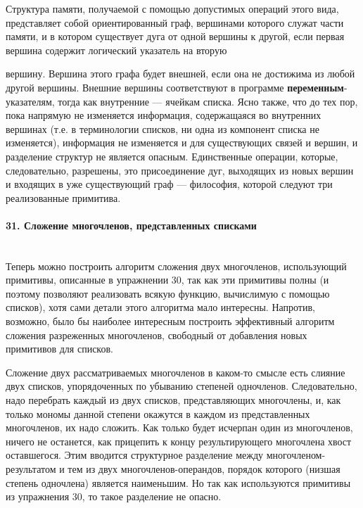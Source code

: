 \documentclass{../../template/mai_book}
\begin{document}
Структура памяти, получаемой с помощью допустимых операций этого вида, представляет собой ориентированный граф, вершинами которого служат части памяти, и в котором существует дуга от одной вершины к другой, если первая вершина содержит логический указатель на вторую \linebreak

\newpage


\noindent
вершину. Вершина этого графа будет внешней, если она не достижима из любой другой вершины. Внешние вершины соответствуют в программе \textbf{переменным}-указателям, тогда как внутренние — ячейкам списка. Ясно также, что до тех пор, пока напрямую не изменяется информация, содержащаяся во внутренних вершинах (т.е. в терминологии списков, ни одна из компонент списка не изменяется), информация не изменяется и для существующих связей и вершин, и разделение структур не является опасным. Единственные операции, которые, следовательно, разрешены, это присоединение дуг, выходящих из новых вершин и входящих в уже существующий граф — философия, которой следуют три реализованные примитива.

\paragraph{31. Сложение многочленов, представленных списками} \mbox{}\\

Теперь можно построить алгоритм сложения двух многочленов, использующий примитивы, описанные в упражнении 30, так как эти примитивы полны (и поэтому позволяют реализовать всякую функцию, вычислимую с помощью списков), хотя сами детали этого алгоритма мало интересны. Напротив, возможно, было бы наиболее интересным построить эффективный алгоритм сложения разреженных  многочленов, свободный от добавления новых примитивов для списков.

Сложение двух рассматриваемых многочленов в каком-то смысле есть слияние двух списков, упорядоченных по убыванию степеней одночленов. Следовательно, надо перебрать каждый из двух списков, представляющих многочлены, и, как только мономы данной степени окажутся в каждом из представленных многочленов, их надо сложить. Как только будет исчерпан один из многочленов, ничего не останется, как прицепить к концу результирующего многочлена хвост  оставшегося. Этим вводится структурное разделение между многочленом-результатом и тем из двух многочленов-операндов, порядок которого (низшая степень одночлена) является наименьшим. Но так как используются примитивы из упражнения 30, то такое разделение не опасно.
\end{document}
